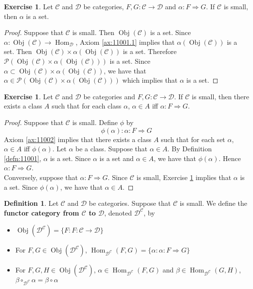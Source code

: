 \documentclass{book}
\theoremstyle{definition}
\newtheorem{defn}[definition]{Definition}
\newtheorem{ex}[definition]{Exercise}
\newcommand{\al}{\alpha}
\newcommand{\be}{\beta}
\newcommand{\MC}{\mathcal{C}}
\newcommand{\MD}{\mathcal{D}}
\newcommand{\MP}{\mathcal{P}}
\newcommand{\lex}[1]{\label{ex:#1}}
\newcommand{\rex}[1]{Exercise \ref{ex:#1}}
\newcommand{\ld}[1]{\label{defn:#1}}
\newcommand{\rd}[1]{Definition \ref{defn:#1}}
\newcommand{\rax}[1]{Axiom \ref{ax:#1}}
\DeclareMathOperator{\Obj}{Obj}
\DeclareMathOperator{\Hom}{Hom}
\DeclareMathOperator*{\0}{\mbf{0}}
\DeclareMathOperator*{\1}{\mbf{1}}
\begin{document}
	\begin{ex} \lex{14004}
		Let $\MC$ and $\MD$ be categories, $F,G: \MC \rightarrow \MD$ and $\al: F \Rightarrow G$. If $\MC$ is small, then $\al$ is a set.
	\end{ex}

	\begin{proof}
		Suppose that $\MC$ is small. Then $\Obj(\MC)$ is a set. Since $\al: \Obj(\MC) \rightarrow \Hom_{\MD}$, \rax{11001.1} implies that $\al(\Obj(\MC))$ is a set. Then $ \Obj(\MC) \times \al(\Obj(\MC))$ is a set. Therefore $\MP(\Obj(\MC) \times \al(\Obj(\MC)))$ is a set. Since $\al \subset \Obj(\MC) \times \al(\Obj(\MC))$, we have that $\al \in \MP(\Obj(\MC) \times \al(\Obj(\MC)))$ which implies that $\al$ is a set. 
	\end{proof}

	\begin{ex} \lex{14005}
			Let $\MC$ and $\MD$ be categories and $F,G: \MC \rightarrow \MD$. If $\MC$ is small, then there exists a class $A$ such that for each class $\al$, $\al \in A$ iff $\al: F \Rightarrow G$. 
	\end{ex}

	\begin{proof}
		Suppose that $\MC$ is small. Define $\phi$ by 
		$$\phi(\al): \al: F \Rightarrow G$$
		\rax{11002} implies that there exists a class $A$ such that for each set $\al$, $\al \in A$ iff $\phi(\al)$. 
		Let $\al$ be a class. Suppose that $\al \in A$. By \rd{11001}, $\al$ is a set. Since $\al$ is a set and $\al \in A$, we have that $\phi(\al)$. Hence $\al:F \Rightarrow G$. \\
		Conversely, suppose that $\al: F \Rightarrow G$.  Since $\MC$ is small, \rex{14004} implies that $\al$ is a set. Since $\phi(\al)$, we have that $\al \in A$. 
	\end{proof}
	
	\begin{defn} \ld{14006}
		Let $\MC$ and $\MD$ be categories. Suppose that $\MC$ is small. We define the \textbf{functor category from $\MC$ to $\MD$}, denoted $\MD^{\MC}$, by 
		\begin{itemize}
			\item $\Obj(\MD^{\MC}) = \{F: F: \MC \rightarrow \MD\}$
			\item For $F, G \in \Obj(\MD^{\MC})$, $\Hom_{\MD^{\MC}}(F, G) = \{\al: \al: F \Rightarrow G \}$
			\item For $F, G, H \in \Obj(\MD^{\MC})$, $\al \in \Hom_{\MD^{\MC}}(F, G)$ and $\be \in \Hom_{\MD^{\MC}}(G, H)$, 
			$\be \circ_{\MD^{\MC}} \al = \be \circ \al $
		\end{itemize} 
	\end{defn}
\end{document}
